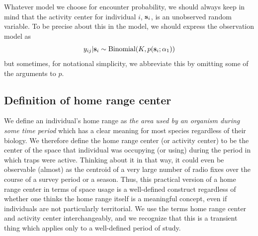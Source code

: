 Whatever model we choose for encounter probability, we should always
keep in mind that the activity center for individual $i$, ${\bf
  s}_{i}$, is an unobserved random variable.  To be precise about this
in the model, we should express the observation model as
\[
y_{ij}|{\bf s}_{i} \sim \mbox{Binomial}(K, p({\bf s}_{i};\alpha_{1}))
\]
but sometimes, for notational simplicity, we abbreviate this by
omitting some of the arguments to $p$.




\subsection{Definition of home range center}

We define an individual's home range as {\it the area used by an
  organism during some time period} which has a clear meaning for most
species regardless of their biology.
We therefore define the
home range center (or activity center) to be the center of the space that individual
was occupying (or using) during the period in which traps were
active. Thinking about it in that way, it could even be observable
(almost) as the centroid of a very large number of radio fixes over
the course of a survey period or a season.  Thus, this practical
version of a home range center in terms of space usage is a
well-defined construct regardless of whether one thinks the home range
itself is a meaningful concept, even if individuals are not
particularly territorial.  We use the terms home range center and
activity center interchangeably, and we recognize that this is a
transient thing which applies only to a well-defined period of study.


